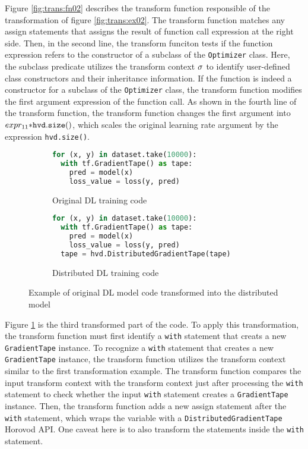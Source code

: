 Figure \ref{fig:trans:fn02} describes the transform function responsible of
the transformation of figure \ref{fig:trans:ex02}.
The transform function matches any assign statements that assigns the
result of function call expression at the right side.
Then, in the second line, the transform funciton tests if the function
expression  refers to the constructor of a subclass of the
{\tt Optimizer} class.
Here, the subclass predicate \ktsubtysubs{\smodenv} utilizes the transform 
context $\sigma$ to identify user-defined class constructors and their 
inheritance information.
If the function  is indeed a constructor for a subclass of the
{\tt Optimizer} class, the transform function modifies the 
first argument expression of the function call.
As shown in the fourth line of the transform function, the  
transform function changes the first argument 
into $expr_{11} {\tt * hvd.size()}$, which scales the original
learning rate argument by the expression {\tt hvd.size()}.

\begin{figure}[ht!]
  \centering
  \begin{subfigure}[t]{0.48\textwidth}
    \begin{lstlisting}[language=Python]
for (x, y) in dataset.take(10000):
  with tf.GradientTape() as tape:
    pred = model(x)
    loss_value = loss(y, pred)\end{lstlisting} 
    \caption{Original DL training code}
  \end{subfigure}
  \hspace{5mm}
  \begin{subfigure}[t]{0.48\textwidth}
    \begin{lstlisting}[language=Python]
for (x, y) in dataset.take(10000):
  with tf.GradientTape() as tape:
    pred = model(x)
    loss_value = loss(y, pred) 
  tape = hvd.DistributedGradientTape(tape)\end{lstlisting}
    \caption{Distributed DL training code}
  \end{subfigure}
  \caption{Example of original DL model code transformed into the distributed model}
  \label{fig:trans:ex03}
\end{figure}

Figure \ref{fig:trans:ex03} is the third transformed part of the code.
To apply this transformation, the transform function must first identify
a {\tt with} statement that creats a new {\tt GradientTape} instance. 
To recognize a {\tt with} statement that creates a new {\tt GradientTape}
instance, the transform function utilizes the transform context similar to
the first transformation example. 
The transform function compares the input transform context with the 
transform context just after processing the {\tt with} statement to check
whether the input {\tt with} statement creates a {\tt GradientTape} instance.
Then, the transform function adds a new assign statement after the 
{\tt with} statement, which wraps the variable with a
{\tt DistributedGradientTape} Horovod API.
One caveat here is to also transform the statements inside the {\tt with}
statement.  
 
